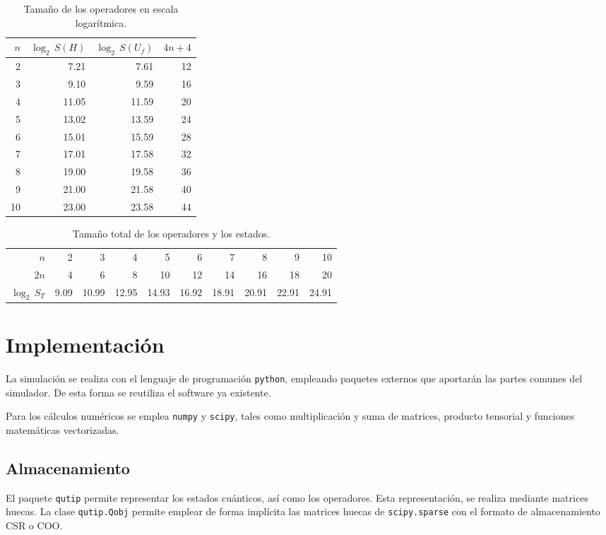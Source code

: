 \begin{ejemplo}
\begin{table}[h]
	\centering
	\begin{tabular}{*{4}{r}}
		\toprule
		$n$ & $\log_2 \, S(H)$ & $\log_2 \, S(U_f)$ & $4n+4$ \\
		\midrule
		2 	& 7.21	& 7.61	& 12\\
		3 	& 9.10	& 9.59	& 16\\
		4 	& 11.05	& 11.59	& 20\\
		5 	& 13.02	& 13.59	& 24\\
		6 	& 15.01	& 15.59	& 28\\
		7 	& 17.01	& 17.58	& 32\\
		8 	& 19.00	& 19.58	& 36\\
		9 	& 21.00	& 21.58	& 40\\
		10 	& 23.00	& 23.58	& 44\\
		\bottomrule
	\end{tabular}
	\caption{Tamaño de los operadores en escala logarítmica.}
\end{table}



\begin{table}[h]
	\centering
	\begin{tabular}{*{10}{r}}
		\toprule
$n$ & 2	& 3	& 4	& 5	& 6	& 7	& 8	& 9	& 10 \\
$2n$& 4	& 6	& 8	& 10	& 12	& 14	& 16	& 18	& 20 \\
$\log_2 \, S_T$ & 9.09	& 10.99	& 12.95	& 14.93	& 16.92	& 18.91	& 20.91	& 22.91	
& 24.91 \\
		\bottomrule
	\end{tabular}
	\caption{Tamaño total de los operadores y los estados.}
\end{table}


\end{ejemplo}

\section{Implementación}

La simulación se realiza con el lenguaje de programación \texttt{python}, 
empleando paquetes externos que aportarán las partes comunes del simulador. De 
esta forma se reutiliza el software ya existente.

Para los cálculos numéricos se emplea \texttt{numpy} y \texttt{scipy}, tales 
como multiplicación y suma de matrices, producto tensorial y funciones 
matemáticas vectorizadas.

\subsection{Almacenamiento}
El paquete \texttt{qutip} permite representar los estados cuánticos, así como 
los operadores. Esta representación, se realiza mediante matrices huecas. La 
clase \texttt{qutip.Qobj} permite emplear de forma implícita las matrices huecas 
de \texttt{scipy.sparse} con el formato de almacenamiento CSR o COO.

